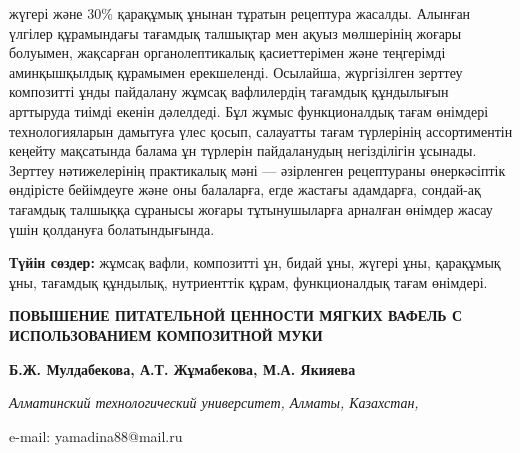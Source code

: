 жүгері және 30\% қарақұмық ұнынан тұратын рецептура жасалды. Алынған
үлгілер құрамындағы тағамдық талшықтар мен ақуыз мөлшерінің жоғары
болуымен, жақсарған органолептикалық қасиеттерімен және теңгерімді
аминқышқылдық құрамымен ерекшеленді. Осылайша, жүргізілген зерттеу
композитті ұнды пайдалану жұмсақ вафлилердің тағамдық құндылығын
арттыруда тиімді екенін дәлелдеді. Бұл жұмыс функционалдық тағам
өнімдері технологияларын дамытуға үлес қосып, салауатты тағам түрлерінің
ассортиментін кеңейту мақсатында балама ұн түрлерін пайдаланудың
негізділігін ұсынады. Зерттеу нәтижелерінің практикалық мәні ---
әзірленген рецептураны өнеркәсіптік өндірісте бейімдеуге және оны
балаларға, егде жастағы адамдарға, сондай-ақ тағамдық талшыққа сұранысы
жоғары тұтынушыларға арналған өнімдер жасау үшін қолдануға
болатындығында.

{\bfseries Түйін сөздер:} жұмсақ вафли, композитті ұн, бидай ұны, жүгері
ұны, қарақұмық ұны, тағамдық құндылық, нутриенттік құрам, функционалдық
тағам өнімдері.

\begin{articleheader}
{\bfseries ПОВЫШЕНИЕ ПИТАТЕЛЬНОЙ ЦЕННОСТИ МЯГКИХ ВАФЕЛЬ С ИСПОЛЬЗОВАНИЕМ
КОМПОЗИТНОЙ МУКИ}

{\bfseries
Б.Ж. Мулдабекова,
А.Т. Жұмабекова,
М.А. Якияева\textsuperscript{\envelope }
}
\end{articleheader}

\begin{affiliation}
\emph{Алматинский технологический университет, Алматы, Казахстан,}

e-mail: yamadina88@mail.ru
\end{affiliation}

